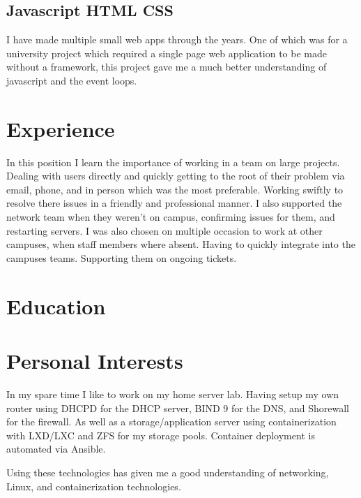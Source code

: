 \documentclass[a4paper]{cv}
\begin{document}
\begin{minipage}[t]{0.33\textwidth}
\sectionspace
\subsection{Javascript \textbullet{} HTML \textbullet{} CSS}
\begin{flushleft}
I have made multiple small web apps through the years. One of which was for a university project which required a single page web application to be made without a framework, this project gave me a much better understanding of javascript and the event loops.
\end{flushleft}

\end{minipage}
\hfill
\begin{minipage}[t]{0.66\textwidth}
\section{Experience}
In this position I learn the importance of working in a team on large projects. Dealing with users directly and quickly getting to the root of their problem via email, phone, and in person which was the most preferable. Working swiftly to resolve there issues in a friendly and professional manner. I also supported the network team when they weren't on campus, confirming issues for them, and restarting servers.
I was also chosen on multiple occasion to work at other campuses, when staff members where absent. Having to quickly integrate into the campuses teams. Supporting them on ongoing tickets.
\section{Education}
\sectionspace

\sectionspace


\section{Personal Interests}
In my spare time I like to work on my home server lab. Having setup my own router using DHCPD for the DHCP server, BIND 9 for the DNS, and Shorewall for the firewall. As well as a storage/application server using containerization with LXD/LXC and ZFS for my storage pools. Container deployment is automated via Ansible.

Using these technologies has given me a good understanding of networking, Linux, and containerization technologies.
\end{minipage}
\end{document}
